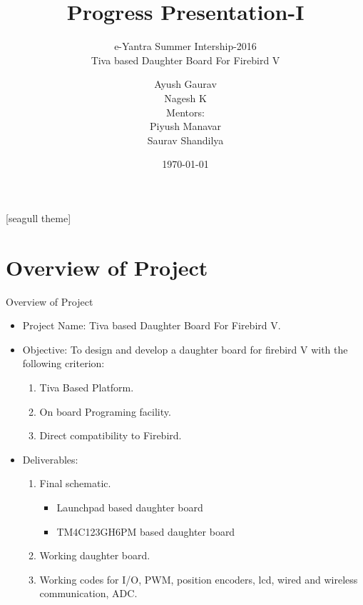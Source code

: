 \documentclass[10pt, a4paper]{beamer}
\begin{document}
	\title{Progress Presentation-I}
	\subtitle{e-Yantra Summer Intership-2016 \\ Tiva based Daughter Board For Firebird V}
	\author{Ayush Gaurav \\Nagesh K \\ Mentors:\\ Piyush Manavar \\Saurav Shandilya \\}
	\date{\today}
	\frame{\titlepage}

[seagull theme]
\section{Overview of Project}
\begin{frame}{Overview of Project}
	\begin{itemize}
		\item Project Name: Tiva based Daughter Board For Firebird V.
		\item Objective: To design and develop a daughter board for firebird V with the following criterion:
			\begin{enumerate}
				\item Tiva Based Platform.
				\item On board Programing facility.
				\item Direct compatibility to Firebird.
			\end{enumerate}
		\item Deliverables:
		\begin{enumerate}
			\item Final schematic.\begin{itemize}
				\item Launchpad based daughter board 
				\item TM4C123GH6PM based daughter board
			\end{itemize}
			\item Working daughter board.
			\item Working codes for I/O, PWM, position encoders, lcd, wired and wireless communication, ADC.
		\end{enumerate}
	\end{itemize}
\end{frame}
\end{document}
